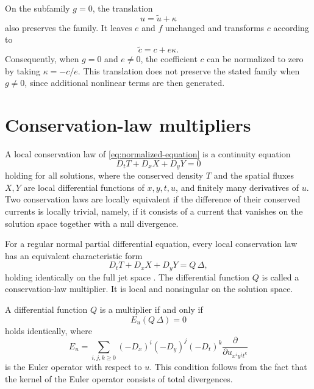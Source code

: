 \documentclass[11pt]{article}
\numberwithin{equation}{section}
\theoremstyle{definition}
\theoremstyle{remark}
\begin{document}
On the subfamily $g=0$, the translation
\begin{equation*}
u=\widetilde{u}+\kappa
\end{equation*}
also preserves the family. It leaves $e$ and $f$ unchanged and
transforms $c$ according to
\begin{equation*}
\widetilde{c}=c+e\kappa.
\end{equation*}
Consequently, when $g=0$ and $e\neq0$, the coefficient $c$ can be
normalized to zero by taking $\kappa=-c/e$. This translation does not
preserve the stated family when $g\neq0$, since additional nonlinear
terms are then generated.
\section{Conservation-law multipliers}
\label{sec:multiplier-framework}
A local conservation law of \eqref{eq:normalized-equation} is a
continuity equation
\begin{equation}
D_tT+D_xX+D_yY=0
\label{eq:conservation-law}
\end{equation}
holding for all solutions, where the conserved density $T$ and the
spatial fluxes $X,Y$ are local differential functions of
$x,y,t,u$, and finitely many derivatives of $u$. Two conservation
laws are locally equivalent if the difference of their conserved
currents is locally trivial, namely, if it consists of a current that
vanishes on the solution space together with a null divergence.

For a regular normal partial differential equation, every local
conservation law has an equivalent characteristic form
\begin{equation}
D_tT+D_xX+D_yY=Q\,\Delta,
\label{eq:characteristic-form}
\end{equation}
holding identically on the full jet space
\cite{AncoBluman2002a,AncoBluman2002b,
BlumanCheviakovAnco2010,Olver1993}. The differential function $Q$ is
called a conservation-law multiplier. It is local and nonsingular on
the solution space.

A differential function $Q$ is a multiplier if and only if
\begin{equation}
E_u\!\left(Q\,\Delta\right)=0
\label{eq:multiplier-equation}
\end{equation}
holds identically, where
\begin{equation*}
E_u
=
\sum_{i,j,k\geq0}
(-D_x)^i(-D_y)^j(-D_t)^k
\frac{\partial}{\partial u_{x^iy^jt^k}}
\end{equation*}
is the Euler operator with respect to $u$. This condition follows
from the fact that the kernel of the Euler operator consists of total
divergences.
\end{document}
